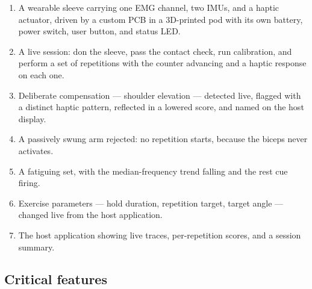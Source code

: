 \documentclass[11pt]{article}
\begin{document}
\begin{enumerate}
\item A wearable sleeve carrying one EMG channel, two IMUs, and a haptic
actuator, driven by a custom PCB in a 3D-printed pod with its own battery, power
switch, user button, and status LED.
\item A live session: don the sleeve, pass the contact check, run calibration,
and perform a set of repetitions with the counter advancing and a haptic
response on each one.
\item Deliberate compensation --- shoulder elevation --- detected live, flagged
with a distinct haptic pattern, reflected in a lowered score, and named on the
host display.
\item A passively swung arm rejected: no repetition starts, because the biceps
never activates.
\item A fatiguing set, with the median-frequency trend falling and the rest cue
firing.
\item Exercise parameters --- hold duration, repetition target, target angle ---
changed live from the host application.
\item The host application showing live traces, per-repetition scores, and a
session summary.
\end{enumerate}

\subsection{Critical features}
\end{document}
